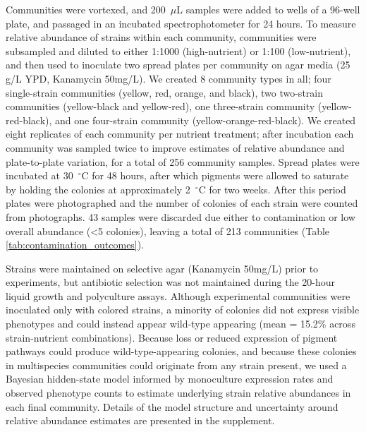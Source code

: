 Communities were vortexed, and 200~$\mu$L samples were added to wells of a 96-well plate, and passaged in an incubated spectrophotometer for 24 hours. To measure relative abundance of strains within each community, communities were subsampled and diluted to either 1:1000 (high-nutrient) or 1:100 (low-nutrient), and then used to inoculate two spread plates per community on agar media (25 g/L YPD, Kanamycin 50mg/L). We created 8 community types in all; four single-strain communities (yellow, red, orange, and black), two two-strain communities (yellow-black and yellow-red), one three-strain community (yellow-red-black), and one four-strain community (yellow-orange-red-black). We created eight replicates of each community per nutrient treatment; after incubation each community was sampled twice to improve estimates of relative abundance and plate-to-plate variation, for a total of 256 community samples. Spread plates were incubated at 30~$^\circ$C for 48 hours, after which pigments were allowed to saturate by holding the colonies at approximately 2~$^\circ$C for two weeks. After this period plates were photographed and the number of colonies of each strain were counted from photographs. 43 samples were discarded due either to contamination or low overall abundance (<5 colonies), leaving a total of 213 communities (Table \ref{tab:contamination_outcomes}).   

Strains were maintained on selective agar (Kanamycin 50mg/L) prior to experiments, but antibiotic selection was not maintained during the 20-hour liquid growth and polyculture assays. Although experimental communities were inoculated only with colored strains, a minority of colonies did not express visible phenotypes and could instead appear wild-type appearing (mean = 15.2\% across strain-nutrient combinations). Because loss or reduced expression of pigment pathways could produce wild-type-appearing colonies, and because these colonies in multispecies communities could originate from any strain present, we used a Bayesian hidden-state model informed by monoculture expression rates and observed phenotype counts to estimate underlying strain relative abundances in each final community. Details of the model structure and uncertainty around relative abundance estimates are presented in the supplement.

